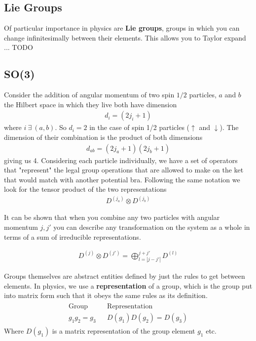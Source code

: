 \subsection{Lie Groups}
Of particular importance in physics are \textbf{Lie groups}, groups in which you can change infinitesimally between their elements. This allows you to Taylor expand ... TODO

\subsection{SO(3)}
Consider the addition of angular momentum of two spin $1/2$ particles, $a$ and $b$ the Hilbert space in which they live both have dimension
\begin{align}
d_i = (2j_i + 1)
\end{align}
where $i ~\exists~(a,b)$. So $d_i = 2$ in the case of spin 1/2 particles ($\uparrow$ and $\downarrow$). The dimension of their combination is the product of both dimensions
\begin{align}
d_{ab} = (2j_a+1)(2j_b+1)
\end{align}
giving us 4. Considering each particle individually, we have a set of operators that "represent" the legal group operations that are allowed to make on the ket that would match with another potential bra. Following the same notation we look for the tensor product of the two representations
\begin{align}
D^{(j_a)}\otimes D^{(j_b)}
\end{align}

It can be shown \cite{sakurai} that when you combine any two particles with angular momentum $j, j'$ you can describe any transformation on the system as a whole in terms of a sum of irreducible representations.

\begin{align}
D^{(j)}\otimes D^{(j')} = \bigoplus^{j+j'}_{l=|j-j'|} D^{(l)}
\end{align}

Groups themselves are abstract entities defined by just the rules to get between elements. In physics, we use a \textbf{representation} of a group, which is the group put into matrix form such that it obeys the same rules as its definition.
\begin{gather}
\begin{align}
\textrm{Group} && \textrm{Representation}\\
g_1g_2 = g_3 && D(g_1)D(g_2) = D(g_3)
\end{align}
\end{gather}
Where $D(g_1)$ is a matrix representation of the group element $g_1$ etc. 

